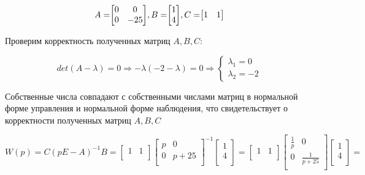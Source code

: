 \documentclass[14pt,a4paper,report]{report}
\begin{document}
\begin{equation*}
\text{$A=$}
\text{$
	\begin{bmatrix}
	0 & 0 \\
	0 & -25 \\
	\end{bmatrix}
	$}
\text{$, B=$}
\text{$
	\begin{bmatrix}
	1 \\
	4 \\
	\end{bmatrix}
	$}
\text{$, C=$}
\text{$
	\begin{bmatrix}
	1 & 1 \\
	\end{bmatrix}
	$}
\end{equation*}

Проверим корректность полученных матриц $A, B, C$:

\begin{equation*}
\text{$det(A-\lambda)=0$}
\Longrightarrow
\text{$-\lambda(-2-\lambda)=0$}
\Longrightarrow
\begin{cases}
	\text{$\lambda_1=0$} \\
	\text{$\lambda_2=-2$}
\end{cases}
\end{equation*}

Собственные числа совпадают с собственными числами матриц в нормальной форме управления и нормальной форме наблюдения, что свидетельствует о корректности полученных матриц  $A, B, C$

\begin{equation*}
\text{$W(p)=C(pE-A)^{-1}B=
	\begin{bmatrix}
	1 & 1 \\
	\end{bmatrix}
	\begin{bmatrix}
	p & 0 \\
	0 & p+25\\
	\end{bmatrix}^{-1}
	\begin{bmatrix}
	1 \\
	4 \\
	\end{bmatrix}=
	\begin{bmatrix}
	1 & 1 \\
	\end{bmatrix}
	\begin{bmatrix}
	\frac{1}{p} & 0 \\
	0 & \frac{1}{p+25}\\
	\end{bmatrix}
	\begin{bmatrix}
	1 \\
	4 \\
	\end{bmatrix}=
	$}
\end{equation*}
\end{document}

